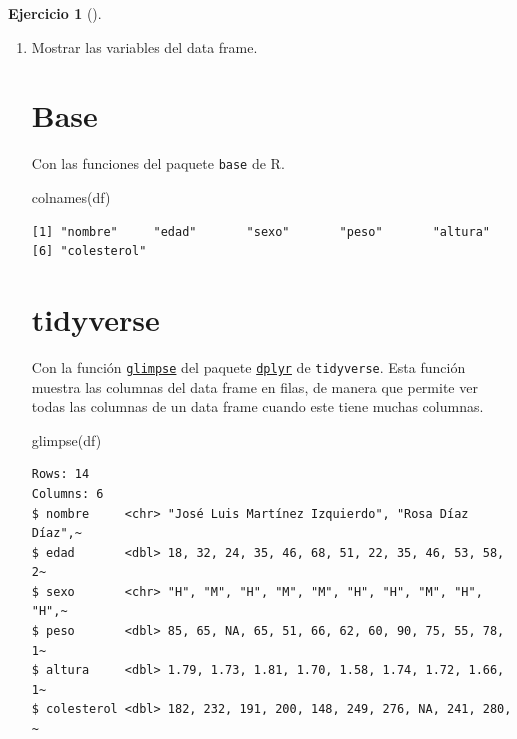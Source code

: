 \documentclass[
  spanish,
  a4paper,
]{scrreport}
\newenvironment{Shaded}{\begin{snugshade}}{\end{snugshade}}
\newcommand{\FunctionTok}[1]{\textcolor[rgb]{0.28,0.35,0.67}{#1}}
\newcommand{\NormalTok}[1]{\textcolor[rgb]{0.00,0.23,0.31}{#1}}
\theoremstyle{definition}
\newtheorem{exercise}{Ejercicio}[chapter]
\theoremstyle{remark}
\begin{document}
\begin{exercise}[]
\begin{enumerate}
\begin{tcolorbox}
  \end{tcolorbox}
\item
  Mostrar las variables del data frame.

  \begin{tcolorbox}[enhanced jigsaw, breakable, leftrule=.75mm, toptitle=1mm, rightrule=.15mm, opacitybacktitle=0.6, left=2mm, colframe=quarto-callout-tip-color-frame, titlerule=0mm, toprule=.15mm, opacityback=0, bottomtitle=1mm, coltitle=black, colbacktitle=quarto-callout-tip-color!10!white, title=\textcolor{quarto-callout-tip-color}{\faLightbulb}\hspace{0.5em}{Solución}, arc=.35mm, bottomrule=.15mm, colback=white]

  \section{Base}

  Con las funciones del paquete \texttt{base} de R.

\begin{Shaded}
\begin{Highlighting}[]
\FunctionTok{colnames}\NormalTok{(df)}
\end{Highlighting}
\end{Shaded}

\begin{verbatim}
[1] "nombre"     "edad"       "sexo"       "peso"       "altura"    
[6] "colesterol"
\end{verbatim}

  \section{tidyverse}

  Con la función
  \href{https://dplyr.tidyverse.org/reference/glimpse.html?q=read_csv\#undefined}{\texttt{glimpse}}
  del paquete
  \href{https://dplyr.tidyverse.org/index.html}{\texttt{dplyr}} de
  \texttt{tidyverse}. Esta función muestra las columnas del data frame
  en filas, de manera que permite ver todas las columnas de un data
  frame cuando este tiene muchas columnas.

\begin{Shaded}
\begin{Highlighting}[]
\FunctionTok{glimpse}\NormalTok{(df)}
\end{Highlighting}
\end{Shaded}

\begin{verbatim}
Rows: 14
Columns: 6
$ nombre     <chr> "José Luis Martínez Izquierdo", "Rosa Díaz Díaz",~
$ edad       <dbl> 18, 32, 24, 35, 46, 68, 51, 22, 35, 46, 53, 58, 2~
$ sexo       <chr> "H", "M", "H", "M", "M", "H", "H", "M", "H", "H",~
$ peso       <dbl> 85, 65, NA, 65, 51, 66, 62, 60, 90, 75, 55, 78, 1~
$ altura     <dbl> 1.79, 1.73, 1.81, 1.70, 1.58, 1.74, 1.72, 1.66, 1~
$ colesterol <dbl> 182, 232, 191, 200, 148, 249, 276, NA, 241, 280, ~
\end{verbatim}


\end{tcolorbox}
\end{enumerate}
\end{exercise}
\end{document}
